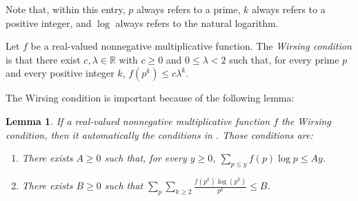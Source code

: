 \documentclass[12pt]{article}
\newtheorem*{lem*}{Lemma}
\begin{document}
Note that, within this entry, $p$ always refers to a prime, $k$ always refers to a positive integer, and $\log$ always refers to the natural logarithm.

Let $f$ be a real-valued nonnegative multiplicative function.  The \emph{Wirsing condition} is that there exist $c, \lambda \in \mathbb{R}$ with $c \ge 0$ and $0 \le \lambda <2$ such that, for every prime $p$ and every positive integer $k$, $f(p^k) \le c \lambda^k$.

The Wirsing condition is important because of the following lemma:

\begin{lem*}
If a real-valued nonnegative multiplicative function $f$  the Wirsing condition, then it automatically  the conditions in .  Those conditions are:

\begin{enumerate}
\item There exists $A \ge 0$ such that, for every $y \ge 0$, $\displaystyle \sum_{p \le y} f(p) \log p \le Ay$.
\item There exists $B \ge 0$ such that $\displaystyle \sum_p \sum_{k \ge 2} \frac{f(p^k)\log(p^k)}{p^k} \le B$.
\end{enumerate}
\end{lem*}
\end{document}
